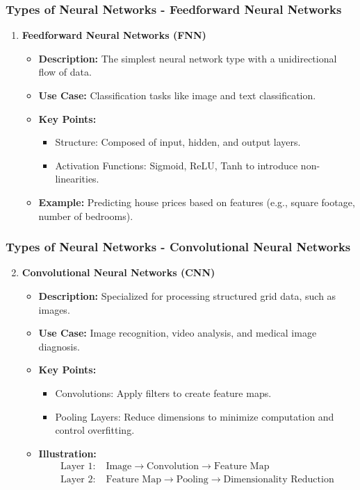 \documentclass[aspectratio=169]{beamer}
\begin{document}
\begin{frame}[fragile]
    \frametitle{Types of Neural Networks - Feedforward Neural Networks}
    \begin{enumerate}
        \item \textbf{Feedforward Neural Networks (FNN)}
        \begin{itemize}
            \item \textbf{Description:} The simplest neural network type with a unidirectional flow of data.
            \item \textbf{Use Case:} Classification tasks like image and text classification.
            \item \textbf{Key Points:}
            \begin{itemize}
                \item Structure: Composed of input, hidden, and output layers.
                \item Activation Functions: Sigmoid, ReLU, Tanh to introduce non-linearities.
            \end{itemize}
            \item \textbf{Example:} Predicting house prices based on features (e.g., square footage, number of bedrooms).
        \end{itemize}
    \end{enumerate}
\end{frame}

\begin{frame}[fragile]
    \frametitle{Types of Neural Networks - Convolutional Neural Networks}
    \begin{enumerate}
        \setcounter{enumi}{1}
        \item \textbf{Convolutional Neural Networks (CNN)}
        \begin{itemize}
            \item \textbf{Description:} Specialized for processing structured grid data, such as images.
            \item \textbf{Use Case:} Image recognition, video analysis, and medical image diagnosis.
            \item \textbf{Key Points:}
            \begin{itemize}
                \item Convolutions: Apply filters to create feature maps.
                \item Pooling Layers: Reduce dimensions to minimize computation and control overfitting.
            \end{itemize}
            \item \textbf{Illustration:}
            \[
            \begin{aligned}
                \text{Layer 1:} & \; \text{Image} \rightarrow \text{Convolution} \rightarrow \text{Feature Map} \\
                \text{Layer 2:} & \; \text{Feature Map} \rightarrow \text{Pooling} \rightarrow \text{Dimensionality Reduction}
            \end{aligned}
            \]
        \end{itemize}
    \end{enumerate}
\end{frame}
\end{document}
